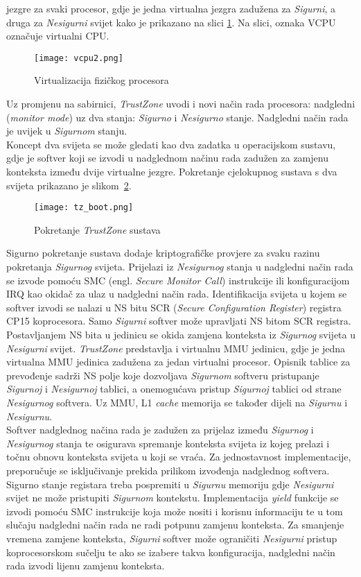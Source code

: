 \documentclass[times, utf8, diplomski, numeric]{fer}
\begin{document}
jezgre za svaki procesor, gdje je jedna virtualna jezgra zadužena za \textit{Sigurni}, a druga za \textit{Nesigurni} svijet kako je prikazano na
slici \ref{vcpu}. Na slici, oznaka VCPU označuje virtualni CPU.
\begin{figure}[H]
  \centering
	\texttt{[image: vcpu2.png]}%
	\caption{Virtualizacija fizičkog procesora}
	\label{vcpu}%
\end{figure}
Uz promjenu na
sabirnici, \textit{TrustZone} uvodi i novi način rada procesora: nadgledni (\textit{monitor mode}) uz dva stanja: \textit{Sigurno}
i \textit{Nesigurno} stanje. Nadgledni način rada je uvijek u \textit{Sigurnom} stanju.\\
Koncept dva svijeta se može gledati kao dva zadatka u operacijskom sustavu, gdje je softver koji se izvodi
u nadglednom načinu rada zadužen za zamjenu konteksta između dvije virtualne jezgre. Pokretanje cjelokupnog sustava s dva
svijeta prikazano je slikom~\ref{tz_boot}.
\begin{figure}[H]
  \centering
	\texttt{[image: tz\_boot.png]}%
	\caption{Pokretanje \textit{TrustZone} sustava}
	\label{tz_boot}%
\end{figure}
Sigurno pokretanje sustava dodaje kriptografičke provjere za svaku razinu pokretanja \textit{Sigurnog} svijeta.
Prijelazi iz \textit{Nesigurnog} stanja u nadgledni
način rada se izvode pomoću SMC (engl. \textit{Secure Monitor Call}) instrukcije ili konfiguracijom IRQ kao okidač za ulaz
u nadgledni način rada. Identifikacija svijeta u kojem se softver izvodi se nalazi u NS bitu SCR (\textit{Secure
Configuration Register}) registra CP15 koprocesora. Samo \textit{Sigurni} softver može upravljati NS bitom SCR registra. Postavljanjem
NS bita u jedinicu se okida zamjena konteksta iz \textit{Sigurnog} svijeta u \textit{Nesigurni} svijet. \textit{TrustZone} predstavlja i
virtualnu MMU jedinicu, gdje je jedna virtualna MMU jedinica zadužena za jedan virtualni procesor. Opisnik tablice za prevođenje
sadrži NS polje koje dozvoljava \textit{Sigurnom} softveru pristupanje \textit{Sigurnoj} i \textit{Nesigurnoj} tablici, a onemogućava pristup \textit{Sigurnoj}
tablici od strane \textit{Nesigurnog} softvera. Uz MMU, L1 \textit{cache} memorija se također dijeli na \textit{Sigurnu} i \textit{Nesigurnu}.\\
Softver nadglednog načina rada je zadužen za prijelaz između \textit{Sigurnog} i \textit{Nesigurnog} stanja te osigurava spremanje konteksta
svijeta iz kojeg prelazi i točnu obnovu konteksta svijeta u koji se vraća. Za jednostavnost implementacije, preporučuje
se isključivanje prekida prilikom izvođenja nadglednog softvera. Sigurno stanje registara treba pospremiti u \textit{Sigurnu} memoriju
gdje \textit{Nesigurni} svijet ne može pristupiti \textit{Sigurnom} kontekstu. Implementacija \textit{yield} funkcije se izvodi pomoću SMC
instrukcije koja može nositi i korisnu informaciju te u tom slučaju nadgledni način rada ne radi potpunu zamjenu konteksta.
Za smanjenje vremena zamjene konteksta, \textit{Sigurni} softver može ograničiti \textit{Nesigurni} pristup koprocesorskom sučelju te ako se
izabere takva konfiguracija, nadgledni način rada izvodi lijenu zamjenu konteksta.
\end{document}
